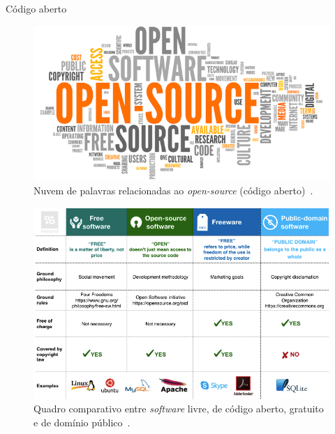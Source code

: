 \begin{frame}{Código aberto}
	\begin{figure}
		\centering
		\includegraphics[scale=0.425]{figs/open_source_word_cloud.png}
		\caption{Nuvem de palavras relacionadas ao \emph{open-source} (código aberto)~\cite{Silva:21}.}
		\label{f.open_source_word_cloud}
	\end{figure}
\end{frame}

\begin{frame}{}
	\begin{figure}
		\centering
		\includegraphics[scale=0.35]{figs/open_source_difference.png}
		\caption{Quadro comparativo entre \emph{software} livre, de código aberto, gratuito e de domínio público~\cite{Todavchich:21}.}
		\label{f.open_source_difference}
	\end{figure}
\end{frame}

